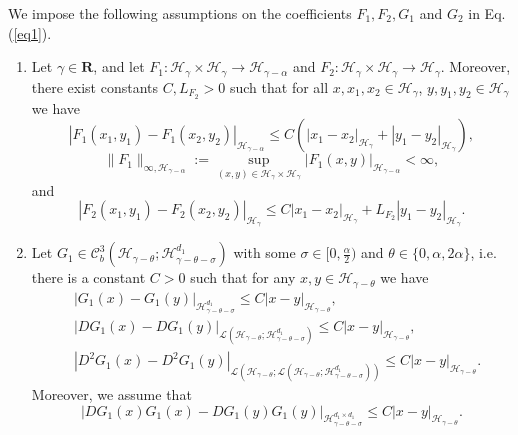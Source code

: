 \documentclass[10pt,a4paper]{article}
\numberwithin{equation}{section}
\begin{document}
We impose the following assumptions on the coefficients $F_1, F_2, G_1$ and $G_2$ in Eq. (\ref{eq1}).



\begin{enumerate}
	\item [$(\mathbf{H1})$]
	Let $\gamma \in \mathbf R$,
and let $F_1:\mathcal{H}_\gamma \times \mathcal{H}_{\gamma}  \to  \mathcal{H}_{\gamma-\alpha}$ and
$F_2:\mathcal{H}_\gamma \times \mathcal{H}_{\gamma} \to\mathcal{H}_{\gamma} $.
Moreover, there exist constants $C,L_{F_2}>0$ such that for all $x,x_1,x_2 \in  \mathcal{H}_\gamma$, $y, y_1,y_2\in \mathcal{H}_\gamma$ we have
		\begin{equation}\label{F1Lip}
			|F_1(x_1,y_1)-F_1(x_2,y_2)|_{\mathcal H_{\gamma-\alpha}} \leq  C(|x_1-x_2|_{\mathcal H_\gamma}+|y_1-y_2|_{\mathcal H_\gamma}),
		\end{equation}
		\begin{equation}\label{F1Bound}
		\|F_1\|_{\infty, \mathcal H_{\gamma-\alpha}}:=\sup_{(x,y)\in \mathcal{H}_\gamma \times \mathcal{H}_\gamma } |F_1(x,y)|_{\mathcal H_{\gamma-\alpha}} <\infty,
	\end{equation}
	and
	\begin{equation}\label{F2Lip}
	|F_2(x_1,y_1)-F_2(x_2,y_2)|_{\mathcal H_{\gamma}} \leq  C|x_1-x_2|_{\mathcal H_\gamma}+L_{F_2}|y_1-y_2|_{\mathcal H_\gamma}.
	\end{equation}
	
	
	
	
	
\item [$(\mathbf{H2})$] Let $G_1 \in \mathcal C_b^3(\mathcal{H}_{\gamma-\theta} ; \mathcal{H}_{\gamma-\theta-\sigma}^{d_1})$
with some $\sigma \in [0,\frac \alpha2)$ and $\theta \in \{0,\alpha, 2\alpha\}$,
i.e. there is a constant $C>0$ such that for any $x,y \in \mathcal{H}_{\gamma-\theta}$ we have
\begin{align}
	&|G_1(x)-G_1(y)|_{\mathcal{H}_{\gamma-\theta-\sigma}^{d_1}} \leq C |x-y|_{\mathcal H_{\gamma-\theta}}, \label{G1} \\
	&  |DG_1(x)-DG_1(y)|_{\mathcal L(\mathcal H_{\gamma-\theta}; \mathcal{H}_{\gamma-\theta-\sigma}^{d_1})}
		\leq C |x-y|_{\mathcal H_{\gamma-\theta}},   \label{DG1}    \\
	&  |D^2G_1(x)-D^2G_1(y)|_{\mathcal L (\mathcal H_{\gamma-\theta}; \mathcal L(\mathcal H_{\gamma-\theta}; \mathcal{H}_{\gamma-\theta-\sigma}^{d_1})) }
		\leq C |x-y|_{\mathcal H_{\gamma-\theta}}.   \label{D2G1}
	\end{align}	
Moreover, we assume that
\begin{equation}\label{DG1G1}
	|DG_1(x)G_1(x)-DG_1(y)G_1(y)|_{\mathcal{H}_{\gamma-\theta-\sigma}^{d_1 \times d_1}}\leq  C |x-y|_{\mathcal H_{\gamma-\theta}}.
\end{equation}	
	

\end{enumerate}
\end{document}
